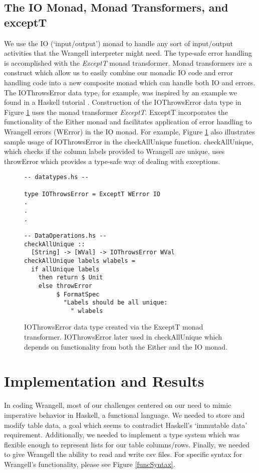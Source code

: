 \documentclass[preprint,nocopyrightspace]{sig-alternate}
\begin{document}
\subsection{The IO Monad, Monad Transformers, and exceptT}
We use the IO (`input/output') monad to handle any sort of input/output activities that the Wrangell interpreter might need. The type-safe error handling is accomplished with the \textit{ExceptT} monad transformer. Monad transformers \cite{monadTransform} are a construct which allow us to easily combine our monadic IO code and error handling code into a new composite monad which can handle both IO and errors.
The IOThrowsError data type, for example, was inspired by an example we found in a Haskell tutorial \cite{writeScheme48}. Construction of the IOThrowsError data type in Figure \ref{IOThrowsError} uses the monad transformer \emph{ExceptT}. ExceptT incorporates the functionality of the Either monad and facilitates application of error handling to Wrangell errors (WError) in the IO monad. For example, Figure \ref{IOThrowsError} also illustrates sample usage of IOThrowsError in the checkAllUnique function. checkAllUnique, which checks if the column labels provided to Wrangell are unique, uses throwError which provides a type-safe way of dealing with exceptions. 


\begin{figure}
\begin{lstlisting}
-- datatypes.hs --

type IOThrowsError = ExceptT WError IO
.
.
.

-- DataOperations.hs --
checkAllUnique :: 
  [String] -> [WVal] -> IOThrowsError WVal
checkAllUnique labels wlabels = 
  if allUnique labels
    then return $ Unit 
    else throwError 
         $ FormatSpec 
           "Labels should be all unique: 
             " wlabels

\end{lstlisting}
\caption{IOThrowsError data type created via the ExceptT monad transformer. IOThrowsError later used in checkAllUnique which depends on functionality from both the Either and the IO monad.}
\label{IOThrowsError}
\end{figure}

  

\section{Implementation and Results}

In coding Wrangell, most of our challenges centered on our need to mimic imperative behavior in Haskell, a functional language. We needed to store and modify table data, a goal which seems to contradict Haskell's `immutable data' requirement. Additionally, we needed to implement a type system which was flexible enough to represent lists for our table columns/rows. Finally, we needed to give Wrangell the ability to read and write csv files. For specific syntax for Wrangell's functionality, please see Figure \ref{funcSyntax}.
\end{document}
